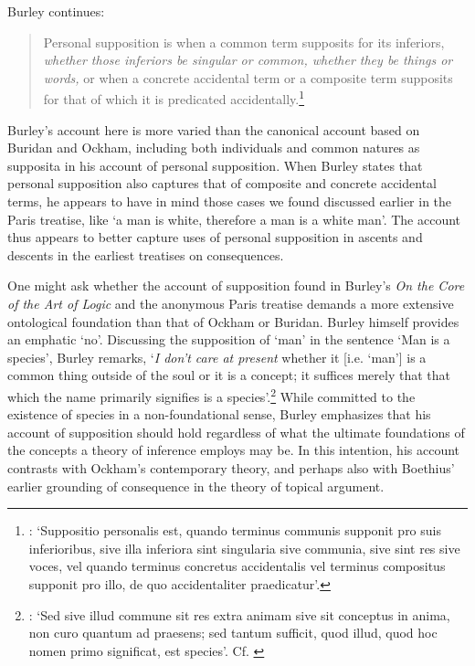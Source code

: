\documentclass[a4paper, 11pt]{article}
\begin{document}
Burley continues:
\begin{quote}
Personal supposition is when a common term supposits for its inferiors, \emph{whether those inferiors be singular or common, whether they be things or words,} or when a concrete accidental term or a composite term supposits for that of which it is predicated accidentally.\footnote{\autocite[3.19-24]{BurleyDPAL}: `Suppositio personalis est, quando terminus communis supponit pro suis inferioribus, sive illa inferiora sint singularia sive communia, sive sint res sive voces, vel quando terminus concretus accidentalis vel terminus compositus supponit pro illo, de quo accidentaliter praedicatur'.}
\end{quote}
Burley's account here is more varied than the canonical account based on Buridan and Ockham, including both individuals and common natures as supposita in his account of personal supposition. When Burley states that personal supposition also captures that of composite and concrete accidental terms, he appears to have in mind those cases we found discussed earlier in the Paris treatise, like `a man is white, therefore a man is a white man'. The account thus appears to better capture uses of personal supposition in ascents and descents in the earliest treatises on consequences. 

One might ask whether the account of supposition found in Burley's \emph{On the Core of the Art of Logic} and the anonymous Paris treatise demands a more extensive ontological foundation than that of Ockham or Buridan. Burley himself provides an emphatic `no'. Discussing the supposition of `man' in the sentence `Man is a species', Burley remarks, `\emph{I don't care at present} whether it [i.e. `man'] is a common thing outside of the soul or it is a concept; it suffices merely that that which the name primarily signifies is a species'.\footnote{\autocite[8.8-10]{BurleyDPAL}: `Sed sive illud commune sit res extra animam sive sit conceptus in anima, non curo quantum ad praesens; sed tantum sufficit, quod illud, quod hoc nomen primo significat, est species'. Cf. \autocite[196.33-37]{OckhamSL}} While committed to the existence of species in a non-foundational sense, Burley emphasizes that his account of supposition should hold regardless of what the ultimate foundations of the concepts a theory of inference employs may be. In this intention, his account contrasts with Ockham's contemporary theory, and perhaps also with Boethius' earlier grounding of consequence in the theory of topical argument.
\end{document}

